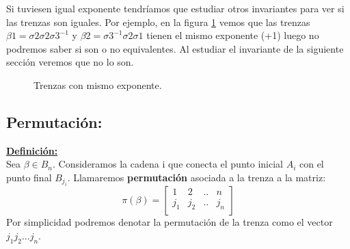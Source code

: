 Si tuviesen igual exponente tendríamos que estudiar otros invariantes para ver si las trenzas son iguales. Por ejemplo, en la figura \ref{exp3} vemos que las trenzas $\beta1 = \sigma2\sigma2\sigma3^{-1}$ y $\beta2 = \sigma3^{-1}\sigma2\sigma1$ tienen el mismo exponente (+1) luego no podremos saber si son o no equivalentes. Al estudiar el invariante de la siguiente sección veremos que no lo son.  \\
	\begin{figure}[h!]
		\centering
		\caption{Trenzas con mismo exponente.}
		\label{exp3} 
	\end{figure}

\bigskip
\subsection{Permutación:}\label{invtren2}
\textbf{\underline{Definición:}}\\
Sea $\beta \in B_{n}$. Consideramos la cadena i que conecta el punto inicial $ A_{i}$ con el punto final $B_{j_{i}}$. Llamaremos \textbf{permutación} asociada a la trenza a la matriz:\\
\[\pi(\beta)=\begin{bmatrix}
1 & 2 & .. & n\\
j_{1} & j_{2} & .. & j_{n} \\
\end{bmatrix}\]
Por simplicidad podremos denotar la permutación de la trenza como el vector $j_{1} j_{2} ... j_{n}$.\\

